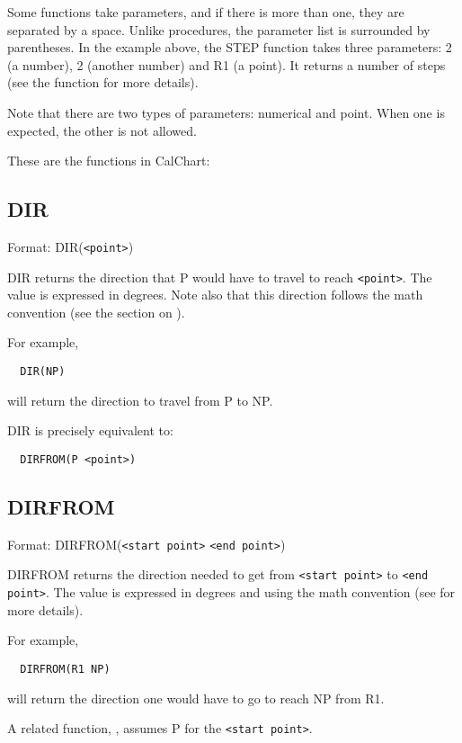 Some functions take parameters, and if there is more than one, they are
separated by a space.  Unlike procedures, the parameter list is surrounded
by parentheses.  In the example above, the STEP function takes three
parameters: 2 (a number), 2 (another number) and R1 (a point).  It returns
a number of steps (see the  function for more details).

Note that there are two types of parameters: numerical and point.
When one is expected, the other is not allowed.

These are the functions in CalChart:

\subsection{DIR}\label{dir}

Format: DIR(\verb$<point>$)

DIR returns the direction that P would have to travel to reach \verb$<point>$.
The value is expressed in degrees.  Note also that this direction follows
the math convention (see the section on ).

For example,
\begin{verbatim}
  DIR(NP)
\end{verbatim}
will return the direction to travel from P to NP.

DIR is precisely equivalent to:
\begin{verbatim}
  DIRFROM(P <point>)
\end{verbatim}

\subsection{DIRFROM}\label{dirfrom}

Format: DIRFROM(\verb$<start point>$ \verb$<end point>$)

DIRFROM returns the direction needed to get from \verb$<start point>$ to
\verb$<end point>$. The value is expressed in degrees and using the math
convention (see  for more details).

For example,
\begin{verbatim}
  DIRFROM(R1 NP)
\end{verbatim}
will return the direction one would have to go to reach NP from R1.

A related function, , assumes P for the \verb$<start point>$.

